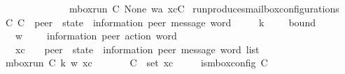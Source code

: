 \begin{isabellebody}
\ \ \ \ \ \ \ \ \ \ \ \ \ \ \ \ mbox{\isacharunderscore}{\kern0pt}run\ C{}\ None\ {\isacharparenleft}{\kern0pt}w{\isasymcdot}{\isacharbrackleft}{\kern0pt}a{\isacharbrackright}{\kern0pt}{\isacharparenright}{\kern0pt}\ {\isacharparenleft}{\kern0pt}xc{\isacharat}{\kern0pt}{\isacharbrackleft}{\kern0pt}C{\isacharbrackright}{\kern0pt}{\isacharparenright}{\kern0pt}{\isachardoublequoteclose}\isanewline
\isanewline
{}\isamarkupfalse%
\ run{\isacharunderscore}{\kern0pt}produces{\isacharunderscore}{\kern0pt}mailbox{\isacharunderscore}{\kern0pt}configurations{\isacharcolon}{\kern0pt}\isanewline
\ \ \ C\ C{\isacharprime}{\kern0pt}\ {\isacharcolon}{\kern0pt}{\isacharcolon}{\kern0pt}\ {\isachardoublequoteopen}{\isacharprime}{\kern0pt}peer\ {\isasymRightarrow}\ {\isacharparenleft}{\kern0pt}{\isacharprime}{\kern0pt}state\ {\isasymtimes}\ {\isacharparenleft}{\kern0pt}{\isacharprime}{\kern0pt}information{\isacharcomma}{\kern0pt}\ {\isacharprime}{\kern0pt}peer{\isacharparenright}{\kern0pt}\ message\ word{\isacharparenright}{\kern0pt}{\isachardoublequoteclose}\isanewline
\ \ \ \ \ k\ \ \ \ {\isacharcolon}{\kern0pt}{\isacharcolon}{\kern0pt}\ {\isachardoublequoteopen}bound{\isachardoublequoteclose}\isanewline
\ \ \ \ \ w\ \ \ \ {\isacharcolon}{\kern0pt}{\isacharcolon}{\kern0pt}\ {\isachardoublequoteopen}{\isacharparenleft}{\kern0pt}{\isacharprime}{\kern0pt}information{\isacharcomma}{\kern0pt}\ {\isacharprime}{\kern0pt}peer{\isacharparenright}{\kern0pt}\ action\ word{\isachardoublequoteclose}\isanewline
\ \ \ \ \ xc\ \ \ {\isacharcolon}{\kern0pt}{\isacharcolon}{\kern0pt}\ {\isachardoublequoteopen}{\isacharparenleft}{\kern0pt}{\isacharprime}{\kern0pt}peer\ {\isasymRightarrow}\ {\isacharparenleft}{\kern0pt}{\isacharprime}{\kern0pt}state\ {\isasymtimes}\ {\isacharparenleft}{\kern0pt}{\isacharprime}{\kern0pt}information{\isacharcomma}{\kern0pt}\ {\isacharprime}{\kern0pt}peer{\isacharparenright}{\kern0pt}\ message\ word{\isacharparenright}{\kern0pt}{\isacharparenright}{\kern0pt}\ list{\isachardoublequoteclose}\isanewline
\ \ \ {\isachardoublequoteopen}mbox{\isacharunderscore}{\kern0pt}run\ C\ k\ w\ xc{\isachardoublequoteclose}\isanewline
\ \ \ \ \ \ \ {\isachardoublequoteopen}C{\isacharprime}{\kern0pt}\ {\isasymin}\ set\ xc{\isachardoublequoteclose}\isanewline
\ \ \ \ \ {\isachardoublequoteopen}is{\isacharunderscore}{\kern0pt}mbox{\isacharunderscore}{\kern0pt}config\ C{\isacharprime}{\kern0pt}{\isachardoublequoteclose}\isanewline

\end{isabellebody}
